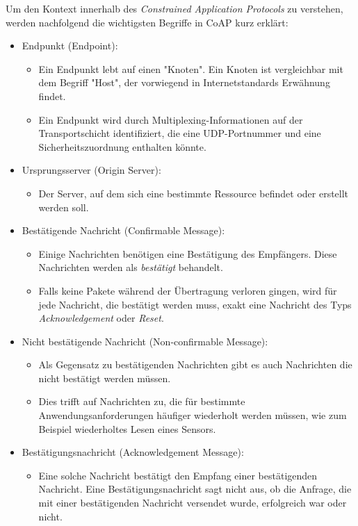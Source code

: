 Um den Kontext innerhalb des \textit{Constrained Application Protocols} zu verstehen, werden nachfolgend die wichtigsten Begriffe in CoAP kurz erklärt:
\begin{itemize}
    \item Endpunkt (Endpoint):
    \begin{itemize}
        \item Ein Endpunkt lebt auf einen "Knoten". Ein Knoten ist vergleichbar mit dem Begriff "Host", der vorwiegend in Internetstandards Erwähnung findet.
        \item Ein Endpunkt wird durch Multiplexing-Informationen auf der Transportschicht identifiziert, die eine UDP-Portnummer und eine Sicherheitszuordnung enthalten könnte.
    \end{itemize}
    \item Ursprungsserver (Origin Server):
    \begin{itemize}
        \item Der Server, auf dem sich eine bestimmte Ressource befindet oder erstellt werden soll.
    \end{itemize}
    \item Bestätigende Nachricht (Confirmable Message):
    \begin{itemize}
        \item Einige Nachrichten benötigen eine Bestätigung des Empfängers. Diese Nachrichten werden als \textit{bestätigt} behandelt.
        \item Falls keine Pakete während der Übertragung verloren gingen, wird für jede Nachricht, die bestätigt werden muss, exakt eine Nachricht des Typs \textit{Acknowledgement} oder \textit{Reset}.
    \end{itemize}
    \item Nicht bestätigende Nachricht (Non-confirmable Message):
    \begin{itemize}
        \item Als Gegensatz zu bestätigenden Nachrichten gibt es auch Nachrichten die nicht bestätigt werden müssen.
        \item Dies trifft auf Nachrichten zu, die für bestimmte Anwendungsanforderungen häufiger wiederholt werden müssen, wie zum Beispiel wiederholtes Lesen eines Sensors.
    \end{itemize}
    \item Bestätigungsnachricht (Acknowledgement Message):
    \begin{itemize}
        \item Eine solche Nachricht bestätigt den Empfang einer bestätigenden Nachricht. Eine Bestätigungsnachricht sagt nicht aus, ob die Anfrage, die mit einer bestätigenden Nachricht versendet wurde, erfolgreich war oder nicht.

\end{itemize}
\end{itemize}
